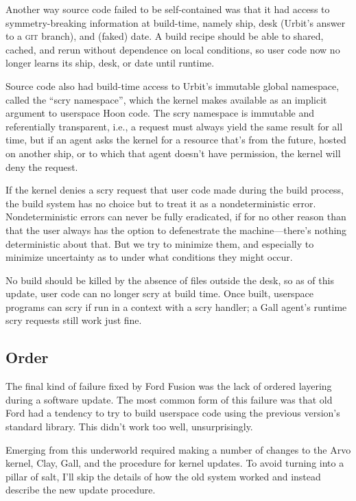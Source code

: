 \documentclass[twoside]{article}
\begin{document}
Another way source code failed to be self-contained was that it had access to symmetry-breaking information at build-time, namely ship, desk (Urbit's answer to a \textsc{git} branch), and (faked) date. A build recipe should be able to shared, cached, and rerun without dependence on local conditions, so user code now no longer learns its ship, desk, or date until runtime.

Source code also had build-time access to Urbit's immutable global namespace, called the “scry namespace”, which the kernel makes available as an implicit argument to userspace Hoon code. The scry namespace is immutable and referentially transparent, i.e., a request must always yield the same result for all time, but if an agent asks the kernel for a resource that’s from the future, hosted on another ship, or to which that agent doesn’t have permission, the kernel will deny the request.

If the kernel denies a scry request that user code made during the build process, the build system has no choice but to treat it as a nondeterministic error. Nondeterministic errors can never be fully eradicated, if for no other reason than that the user always has the option to defenestrate the machine—there's nothing deterministic about that. But we try to minimize them, and especially to minimize uncertainty as to under what conditions they might occur.

No build should be killed by the absence of files outside the desk, so as of this update, user code can no longer scry at build time. Once built, userspace programs can scry if run in a context with a scry handler; a Gall agent's runtime scry requests still work just fine.

\subsection{Order}

The final kind of failure fixed by Ford Fusion was the lack of ordered layering during a software update. The most common form of this failure was that old Ford had a tendency to try to build userspace code using the previous version's standard library. This didn't work too well, unsurprisingly.

Emerging from this underworld required making a number of changes to the Arvo kernel, Clay, Gall, and the procedure for kernel updates. To avoid turning into a pillar of salt, I'll skip the details of how the old system worked and instead describe the new update procedure.
\end{document}
